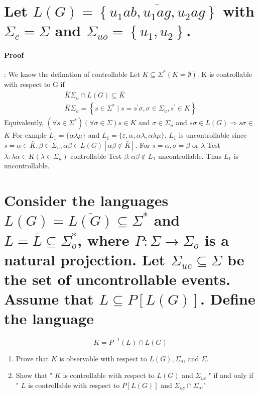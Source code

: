 \documentclass{article}
\begin{document}
\section{ Let $L(G)=\overline{\left\{u_1 a b, u_1 a g, u_2 a g\right\}}$ with  $\Sigma_c=\Sigma $ and $ \Sigma_{u o}=\left\{u_1, u_2\right\} $.}

\paragraph{Proof}:
We know the defination of controllable Let $K \subseteq \Sigma^*(K=\emptyset)$. $\mathrm{K}$ is controllable with respect to $\mathrm{G}$ if
$$
\begin{array}{r}
\bar{K} \Sigma_u \cap L(G) \subseteq \bar{K} \\
\bar{K} \Sigma_u=\left\{s \in \Sigma^* \mid s=s^{\prime} \sigma, \sigma \in \Sigma_u, s^{\prime} \in K\right\}
\end{array}
$$
Equivalently, $\left(\forall s \in \Sigma^*\right)(\forall \sigma \in \Sigma) s \in K$ and $\sigma \in \Sigma_u$ and $s \sigma \in L(G) \Rightarrow s \sigma \in$
$K$
For exmple $L_1=\{\alpha \lambda \mu\}$ and $\overline{L_1}=\{\varepsilon, \alpha, \alpha \lambda, \alpha \lambda \mu\}$. $L_1$ is uncontrollable since $s=\alpha \in \bar{K}, \beta \in \Sigma_u, \alpha \beta \in L(G)[\alpha \beta \notin \bar{K}]$. For $s=\alpha, \sigma=\beta$ or $\lambda$
Test $\lambda: \lambda \alpha \in K\left(\lambda \in \Sigma_u\right)$ controllable
Test $\beta: \alpha \beta \notin L_1$ uncontrollable. Thus $L_1$ is uncontrollable.

\section{Consider the languages $L(G)=\overline{L(G)} \subseteq \Sigma^*$ and $L=\bar{L} \subseteq \Sigma_o^*$, where $P: \Sigma \rightarrow \Sigma_o$ is a natural projection. Let $\Sigma_{u c} \subseteq \Sigma$ be the set of uncontrollable events. Assume that $L \subseteq P[L(G)]$. Define the language}

$$
K=P^{-1}(L) \cap L(G)
$$

\begin{enumerate}
  \item Prove that $K$ is observable with respect to $L(G), \Sigma_o$, and $\Sigma$.
  \item Show that " $K$ is controllable with respect to $L(G)$ and $\Sigma_{u c}$ " if and only if " $L$ is controllable with respect to $P[L(G)]$ and $\Sigma_{u c} \cap \Sigma_o$."
\end{enumerate}
\end{document}
